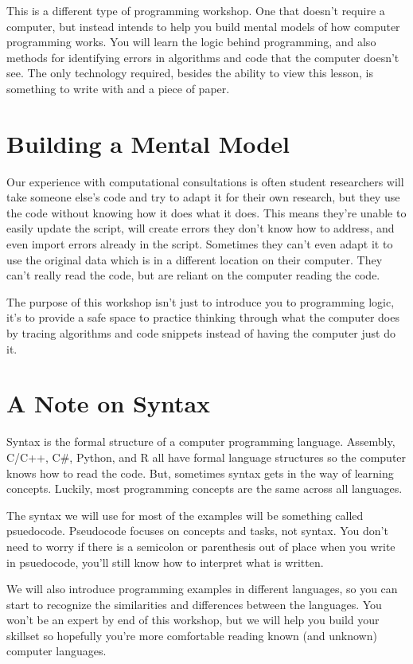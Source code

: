 \documentclass[
]{book}
\begin{document}
This is a different type of programming workshop. One that doesn't require a computer, but instead intends to help you build mental models of how computer programming works. You will learn the logic behind programming, and also methods for identifying errors in algorithms and code that the computer doesn't see. The only technology required, besides the ability to view this lesson, is something to write with and a piece of paper.

\section{Building a Mental Model}\label{building-a-mental-model}

Our experience with computational consultations is often student researchers will take someone else's code and try to adapt it for their own research, but they use the code without knowing how it does what it does. This means they're unable to easily update the script, will create errors they don't know how to address, and even import errors already in the script. Sometimes they can't even adapt it to use the original data which is in a different location on their computer. They can't really read the code, but are reliant on the computer reading the code.

The purpose of this workshop isn't just to introduce you to programming logic, it's to provide a safe space to practice thinking through what the computer does by tracing algorithms and code snippets instead of having the computer just do it.

\section{A Note on Syntax}\label{a-note-on-syntax}

Syntax is the formal structure of a computer programming language. Assembly, C/C++, C\#, Python, and R all have formal language structures so the computer knows how to read the code. But, sometimes syntax gets in the way of learning concepts. Luckily, most programming concepts are the same across all languages.

The syntax we will use for most of the examples will be something called psuedocode. Pseudocode focuses on concepts and tasks, not syntax. You don't need to worry if there is a semicolon or parenthesis out of place when you write in psuedocode, you'll still know how to interpret what is written.

We will also introduce programming examples in different languages, so you can start to recognize the similarities and differences between the languages. You won't be an expert by end of this workshop, but we will help you build your skillset so hopefully you're more comfortable reading known (and unknown) computer languages.
\end{document}

